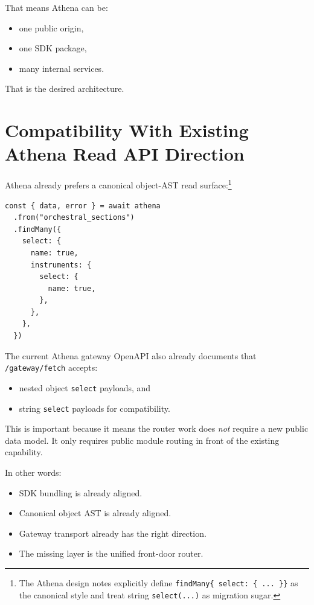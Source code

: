 \documentclass[11pt]{article}
\begin{document}
That means Athena can be:

\begin{itemize}[leftmargin=1.5em]
  \item one public origin,
  \item one SDK package,
  \item many internal services.
\end{itemize}

That is the desired architecture.

\section{Compatibility With Existing Athena Read API Direction}

Athena already prefers a canonical object-AST read surface:\footnote{The Athena design notes explicitly define \texttt{findMany\{ select: \{ ... \}\}} as the canonical style and treat string \texttt{select(...)} as migration sugar.}

\begin{lstlisting}[language=TypeScriptAthena]
const { data, error } = await athena
  .from("orchestral_sections")
  .findMany({
    select: {
      name: true,
      instruments: {
        select: {
          name: true,
        },
      },
    },
  })
\end{lstlisting}

The current Athena gateway OpenAPI also already documents that \texttt{/gateway/fetch} accepts:

\begin{itemize}[leftmargin=1.5em]
  \item nested object \texttt{select} payloads, and
  \item string \texttt{select} payloads for compatibility.
\end{itemize}

This is important because it means the router work does \emph{not} require a new public data model. It only requires public module routing in front of the existing capability.

In other words:

\begin{itemize}[leftmargin=1.5em]
  \item SDK bundling is already aligned.
  \item Canonical object AST is already aligned.
  \item Gateway transport already has the right direction.
  \item The missing layer is the unified front-door router.
\end{itemize}
\end{document}
